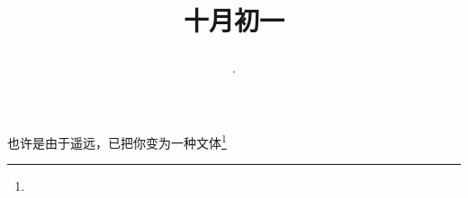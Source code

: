 \title{\date[d=1,m=11,y=2024][year:cn-y,年,month:cn,day:cn,日,·,weekday]·十月初一 }
也许是由于遥远，已把你变为一种文体\footnote{ }

